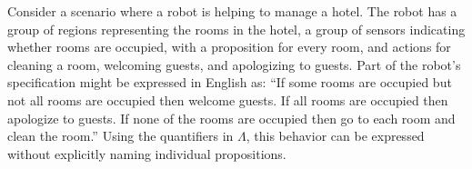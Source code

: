 \begin{myExample}\label{Ex:quantifiers} 	
	Consider a scenario where a robot is helping to manage a hotel. 
	The robot has a group of regions representing the rooms in the hotel, a group of sensors indicating whether rooms are occupied, with a proposition for every room, and actions for cleaning a room, welcoming guests, and apologizing to guests. 
	Part of the robot's specification might be expressed in English as:
	``If some rooms are occupied but not all rooms are occupied then welcome guests. 
	If all rooms are occupied then apologize to guests. 
	If none of the rooms are occupied then go to each room and clean the room.''
	Using the quantifiers in $\Lambda$, this behavior can be expressed without explicitly naming individual propositions. 
\end{myExample}

